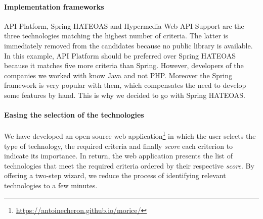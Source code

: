 \paragraph{Implementation frameworks}
API Platform, Spring HATEOAS and Hypermedia Web API Support \cite{salvadori2014framework} are the three technologies matching the highest number of criteria. The latter is immediately removed from the candidates because no public library is available. In this example, API Platform should be preferred over Spring HATEOAS because it matches five more criteria than Spring. However, developers of the companies we worked with know Java and not PHP. Moreover the Spring framework is very popular with them, which compensates the need to develop some features by hand. This is why we decided to go with Spring HATEOAS.

\paragraph{Easing the selection of the technologies}
We have developed an open-source web application{\footnote{\url{https://antoinecheron.github.io/morice/}}} in which the user selects the type of technology, the required criteria and finally \textit{score} each criterion to indicate its importance. 
In return, the web application presents the list of technologies that meet the required criteria ordered by their respective \textit{score}.
By offering a two-step wizard, we reduce the process of identifying relevant technologies to a few minutes.


